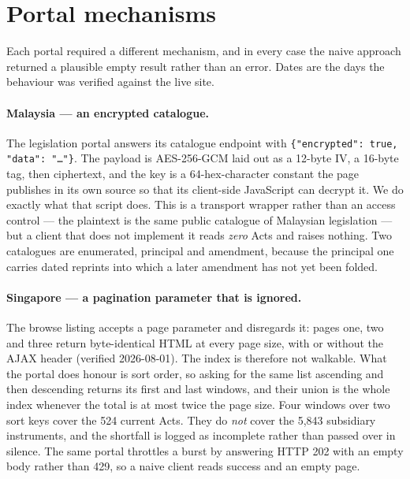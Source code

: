 \documentclass{article}
\begin{document}



\appendix

\section{Portal mechanisms}
\label{app:portals}

Each portal required a different mechanism, and in every case the naive approach
returned a plausible empty result rather than an error. Dates are the days the
behaviour was verified against the live site.

\paragraph{Malaysia --- an encrypted catalogue.} The legislation portal answers
its catalogue endpoint with \texttt{\{"encrypted": true, "data": "\ldots"\}}. The
payload is AES-256-GCM laid out as a 12-byte IV, a 16-byte tag, then ciphertext,
and the key is a 64-hex-character constant the page publishes in its own source
so that its client-side JavaScript can decrypt it. We do exactly what that script
does. This is a transport wrapper rather than an access control --- the plaintext
is the same public catalogue of Malaysian legislation --- but a client that does
not implement it reads \emph{zero} Acts and raises nothing. Two catalogues are
enumerated, principal and amendment, because the principal one carries dated
reprints into which a later amendment has not yet been folded.

\paragraph{Singapore --- a pagination parameter that is ignored.} The browse
listing accepts a page parameter and disregards it: pages one, two and three
return byte-identical HTML at every page size, with or without the AJAX header
(verified 2026-08-01). The index is therefore not walkable. What the portal does
honour is sort order, so asking for the same list ascending and then descending
returns its first and last windows, and their union is the whole index whenever
the total is at most twice the page size. Four windows over two sort keys cover
the 524 current Acts. They do \emph{not} cover the 5{,}843 subsidiary
instruments, and the shortfall is logged as incomplete rather than passed over in
silence. The same portal throttles a burst by answering HTTP 202 with an empty
body rather than 429, so a naive client reads success and an empty page.
\end{document}
